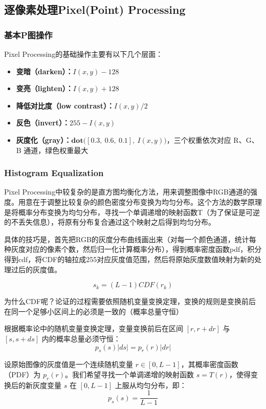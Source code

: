 \documentclass{ctexart}
\begin{document}
\subsection{逐像素处理Pixel(Point) Processing}

\subsubsection{基本P图操作}
Pixel Processing的基础操作主要有以下几个层面：

\begin{itemize}
    \item \textbf{变暗（darken）：}$I(x,y) - 128$
    \item \textbf{变亮（lighten）：}$I(x,y) + 128$
    \item \textbf{降低对比度（low contrast）：}$I(x,y)/2$
    \item \textbf{反色（invert）：}$255 - I(x,y)$
    \item \textbf{灰度化（gray）：}$\mathbf{dot}\bigl([0.3,\ 0.6,\ 0.1],\ I(x,y)\bigr)$，三个权重依次对应 R、G、B 通道，绿色权重最大
\end{itemize}

\subsubsection{Histogram Equalization}
Pixel Processing中较复杂的是直方图均衡化方法，用来调整图像中RGB通道的强度。用意在于调整比较复杂的颜色密度分布变换为均匀分布。这个方法的数学原理是将概率分布变换为均匀分布，寻找一个单调递增的映射函数T（为了保证是可逆的不丢失信息），将原有分布复合通过这个映射之后得到均匀分布。

具体的技巧是，首先把RGB的灰度分布曲线画出来（对每一个颜色通道，统计每种灰度对应的像素个数，然后归一化计算概率分布），得到概率密度函数pdf，积分得到cdf，将CDF的轴拉成255对应灰度值范围，然后将原始灰度数值映射为新的处理过后的灰度值。

\[
s_k = (L - 1)CDF(r_k)
\]

为什么CDF呢？论证的过程需要依照随机变量变换定理，变换的规则是变换前后在同一个足够小区间上的必须是一致的（概率总量守恒）

根据概率论中的随机变量变换定理，变量变换前后在区间 $[r, r+dr]$ 与 $[s, s+ds]$ 内的概率总量必须守恒：$$p_s(s) \vert{}ds\vert{} = p_r(r) \vert{}dr\vert{}$$

设原始图像的灰度值是一个连续随机变量 $r \in [0, L-1]$，其概率密度函数（PDF）为 $p_r(r)$。我们希望寻找一个单调递增的映射函数 $s = T(r)$，使得变换后的新灰度变量 $s$ 在 $[0, L-1]$ 上服从均匀分布，即：$$p_s(s) = \frac{1}{L-1}$$
\end{document}
